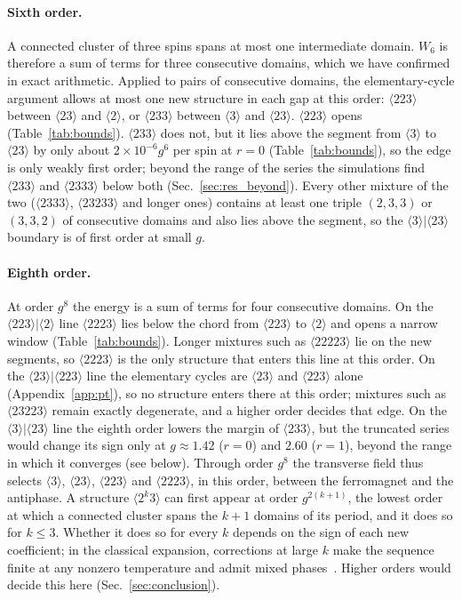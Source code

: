 \documentclass[
 aps,prb,
 twocolumn,
 superscriptaddress,
 longbibliography,
 nofootinbib,
 floatfix
]{revtex4-2}
\begin{document}
\paragraph*{Sixth order.}
A connected cluster of three spins spans at most one intermediate domain. $W_6$ is therefore a sum of terms
for three consecutive domains, which we have confirmed in exact arithmetic.
Applied to pairs of consecutive domains, the elementary-cycle argument allows at most one new structure in
each gap at this order: $\langle223\rangle$ between $\langle23\rangle$ and $\langle2\rangle$, or
$\langle233\rangle$ between $\langle3\rangle$ and $\langle23\rangle$. $\langle223\rangle$ opens
(Table~\ref{tab:bounds}).
$\langle233\rangle$ does not, but it lies above the segment from $\langle3\rangle$ to $\langle23\rangle$ by only
about $2\times10^{-6}g^6$ per spin at $r=0$ (Table~\ref{tab:bounds}), so the edge is only weakly first order; beyond the
range of the series the simulations find $\langle233\rangle$ and $\langle2333\rangle$ below both
(Sec.~\ref{sec:res_beyond}). Every other
mixture of the two ($\langle2333\rangle$, $\langle23233\rangle$ and longer ones) contains at least one triple $(2,3,3)$
or $(3,3,2)$ of consecutive domains and also lies above the segment, so the $\langle3\rangle|\langle23\rangle$ boundary is
of first order at small $g$.

\paragraph*{Eighth order.}
At order $g^8$ the energy is a sum of terms for four consecutive domains. On the $\langle223\rangle|\langle2\rangle$
line $\langle2223\rangle$ lies below the chord from $\langle223\rangle$ to $\langle2\rangle$ and opens a narrow window
(Table~\ref{tab:bounds}). Longer mixtures such as $\langle22223\rangle$ lie on the new segments, so $\langle2223\rangle$ is
the only structure that enters this line at this order. On the $\langle23\rangle|\langle223\rangle$ line
the elementary cycles are $\langle23\rangle$ and $\langle223\rangle$ alone (Appendix~\ref{app:pt}), so no structure enters
there at this order; mixtures such as $\langle23223\rangle$ remain exactly degenerate, and a higher order decides that
edge. On the
$\langle3\rangle|\langle23\rangle$ line the eighth order lowers the margin of $\langle233\rangle$, but the truncated series
would change its sign only at $g\approx1.42$ ($r=0$) and $2.60$ ($r=1$), beyond the range in which it converges (see
below).
Through order $g^8$ the transverse field thus selects $\langle3\rangle$, $\langle23\rangle$, $\langle223\rangle$ and
$\langle2223\rangle$, in this order, between the ferromagnet and the antiphase. A structure $\langle2^k3\rangle$ can
first appear at order $g^{2(k+1)}$, the lowest order at which a connected cluster spans the $k+1$ domains of its
period, and it does so for $k\le3$. Whether it does so for every $k$ depends on the sign of each new coefficient;
in the classical expansion, corrections at large $k$ make the sequence finite at any nonzero temperature and admit
mixed phases~\cite{yeomans1988theory,selke1988annni}. Higher orders would decide this here (Sec.~\ref{sec:conclusion}).
\end{document}
